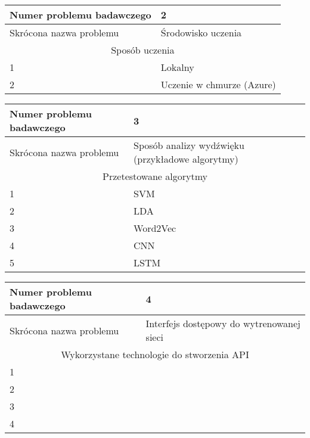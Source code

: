 \documentclass[11pt,a4paper]{article}
\begin{document}
\begin{center}
\end{center}
\begin{table}[h]
    \centering
    \begin{tabular}{|p{4.5cm}|p{9cm}|}
        \hline
         Numer problemu badawczego & 2 \\
         \hline
         Skrócona nazwa problemu & Środowisko uczenia\\
         \hline
         \multicolumn{2}{|c|}{Sposób uczenia} \\ \hline
         1 & Lokalny \\ \hline
         2 &  Uczenie w chmurze (Azure)\\ \hline
    \end{tabular}
    \label{tab:my_label}
\end{table}


\begin{table}[h]
    \centering
    \begin{tabular}{|p{4.5cm}|p{9cm}|}
        \hline
         Numer problemu badawczego & 3 \\
         \hline
         Skrócona nazwa problemu & Sposób analizy wydźwięku (przykładowe algorytmy)\\
         \hline
         \multicolumn{2}{|c|}{Przetestowane algorytmy} \\ \hline
         1 &   SVM  \\ \hline
         2 &   LDA\\ \hline
         3 &   Word2Vec\\ \hline
         4 &   CNN\\ \hline
         5 &   LSTM\\ \hline 
    \end{tabular}
    \label{tab:my_label1}
\end{table}

\begin{table}[h]
    \centering
    \begin{tabular}{|p{4.5cm}|p{9cm}|}
        \hline
         Numer problemu badawczego & 4 \\
         \hline
         Skrócona nazwa problemu & Interfejs dostępowy do wytrenowanej sieci\\
         \hline
         \multicolumn{2}{|c|}{Wykorzystane technologie do stworzenia API} \\ \hline
         1 &  \\ \hline
         2 &  \\ \hline
         3 &  \\ \hline
         4 &  \\ \hline
    \end{tabular}
    \label{tab:my_label2}
\end{table}
\end{document}
